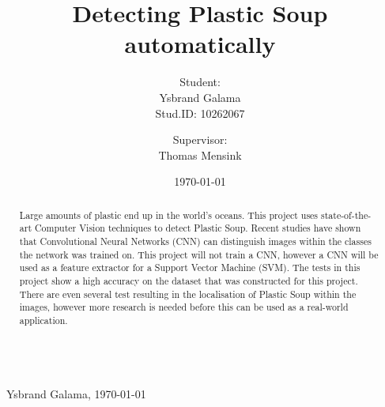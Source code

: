 \documentclass[a4paper, 11pt]{article}
\title{Detecting Plastic Soup automatically}
\author{Student:\\Ysbrand Galama \\ Stud.ID: 10262067 \and Supervisor:\\ Thomas Mensink }
\date{\today}
\begin{document}
\def\showapp{1} %

\ifx\showintro\undefined


\tableofcontents

\vfill
\begin{abstract}
Large amounts of plastic end up in the world's oceans.
This project uses state-of-the-art Computer Vision techniques to detect Plastic Soup.
Recent studies have shown that Convolutional Neural Networks (CNN) can distinguish images within the classes the network was trained on.
This project will not train a CNN, however a CNN will be used as a feature extractor for a Support Vector Machine (SVM).
The tests in this project show a high accuracy on the dataset that was constructed for this project.
There are even several test resulting in the localisation of Plastic Soup within the images, however more research is needed before this can be used as a real-world application.
\end{abstract}
\vfill
\newpage
\else
{}\\ \mbox{}~\hfill{Ysbrand Galama, \today}
\fi


\ifx\showpbreak\undefined \clearpage \fi


\ifx\showpbreak\undefined \clearpage \fi


\ifx\showpbreak\undefined \clearpage \fi


\ifx\showpbreak\undefined \clearpage \fi


\ifx\showpbreak\undefined \clearpage \fi


\ifx\showpbreak\undefined \clearpage \fi




\end{document}

